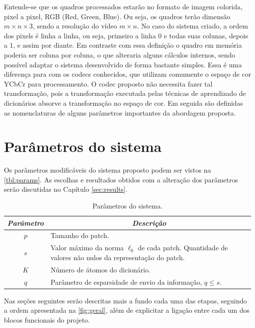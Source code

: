 \documentclass[cic,tc]{iiufrgs}
\begin{document}
Entende-se que os quadros processados estarão no formato de imagem colorida,
pixel a pixel, RGB (Red, Green, Blue). 
Ou seja, os quadros terão dimensão 
$m \times n \times 3$,
sendo a resolução do vídeo $m \times n$. 
No caso do sistema criado, a ordem dos pixels é 
linha a linha, ou seja, primeiro a linha $0$ e todas suas colunas, depois a $1$, e assim por diante.
Em contraste com essa definição o quadro em memória poderia ser coluna por coluna, o que alteraria
alguns cálculos internos, sendo possível adaptar o sistema desenvolvido de forma bastante simples.
Essa é uma diferença para com os codecs conhecidos, que utilizam comumente o espaço de cor YCbCr
para processamento.
O codec proposto não necessita fazer tal transformação, pois a transformação executada pelas 
técnicas de aprendizado de dicionários absorve a transformação no espaço de cor.
Em seguida são definidas as nomenclaturas de alguns parâmetros importantes da abordagem proposta.

\section{Parâmetros do sistema}
Os parâmetros modificáveis do sistema proposto podem ser vistos na \autoref{tbl:params}. 
As escolhas e resultados obtidos com a alteração dos parâmetros serão discutidas no 
Capítulo \ref{sec:results}.

\begin{table}[h]
    \caption{Parâmetros do sistema.}
    \centering
        \begin{tabular}{|c|p{10cm}|}
          \hline
          \multicolumn{1}{|c|}{\textit{Parâmetro}} & 
            \multicolumn{1}{c|}{\textit{Descrição}}\\
          \hline
          \hline
          $p$    & Tamanho do patch. \\ 
          $s$    & Valor máximo da norma $\ell_0$ de cada patch. Quantidade de valores não nulos da representação do patch. \\     
          $K$    & Número de átomos do dicionário. \\
          $q$    & Parâmetro de esparsidade de envio da informação, $q \le s$. \\
          \hline
        \end{tabular}
    \label{tbl:params}
\end{table}

Nas seções seguintes serão descritas mais a fundo cada uma das etapas, seguindo a ordem
apresentada na \autoref{fig:geral}, além de explicitar a ligação entre cada um dos blocos funcionais
do projeto.
\end{document}
